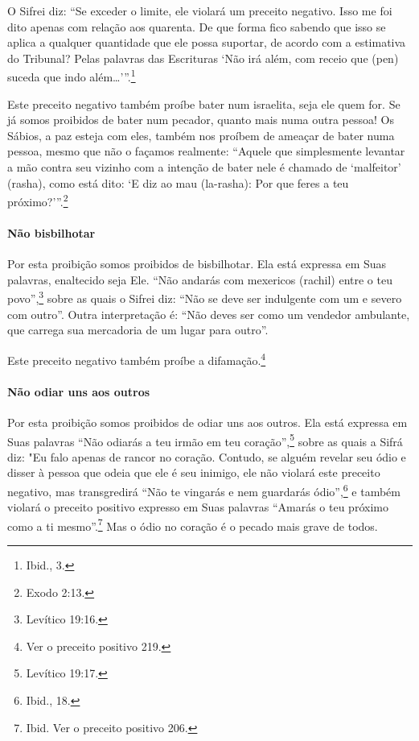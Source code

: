 O Sifrei diz: ``Se exceder o limite, ele violará um preceito negativo.
Isso me foi dito apenas com relação aos quarenta. De que forma fico
sabendo que isso se aplica a qualquer quantidade que ele possa suportar,
de acordo com a estimativa do Tribunal? Pelas palavras das Escrituras
`Não irá além, com receio que (pen) suceda que indo além\ldots{}'''.\footnote{Ibid., 3.}

Este preceito negativo também proíbe bater num israelita, seja ele quem
for. Se já somos proibidos de bater num pecador, quanto mais numa outra
pessoa! Os Sábios, a paz esteja com eles, também nos proíbem de ameaçar
de bater numa pessoa, mesmo que não o façamos realmente: ``Aquele que
simplesmente levantar a mão contra seu vizinho com a intenção de bater
nele é chamado de `malfeitor' (rasha), como está dito: `E diz ao mau
(la-rasha): Por que feres a teu próximo?'''.\footnote{Exodo 2:13.}

\paragraph{Não bisbilhotar}

Por esta proibição somos proibidos de bisbilhotar. Ela está expressa em
Suas palavras, enaltecido seja Ele. ``Não andarás com mexericos (rachil)
entre o teu povo'',\footnote{Levítico 19:16.} sobre as quais o Sifrei diz: ``Não
se deve ser indulgente com um e severo com outro''. Outra interpretação
é: ``Não deves ser como um vendedor ambulante, que carrega sua
mercadoria de um lugar para outro''.

Este preceito negativo também proíbe a difamação.\footnote{Ver o preceito positivo 219.}

\paragraph{Não odiar uns aos outros}

Por esta proibição somos proibidos de odiar uns aos outros. Ela está
expressa em Suas palavras ``Não odiarás a teu irmão em teu coração'',\footnote{Levítico 19:17.} sobre as quais a Sifrá diz: "Eu falo apenas de rancor
no coração. Contudo, se alguém revelar seu ódio e
disser à pessoa que odeia que ele é seu inimigo, ele não violará este
preceito negativo, mas transgredirá ``Não te vingarás e nem guardarás
ódio'',\footnote{Ibid., 18.} e também violará o preceito positivo expresso em
Suas palavras ``Amarás o teu próximo como a ti mesmo''.\footnote{Ibid. Ver o preceito positivo 206.} Mas o ódio no coração é o pecado mais grave de todos.

